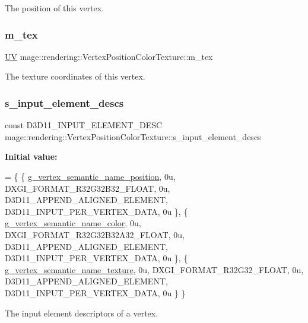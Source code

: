 The position of this vertex. \mbox{\label{structmage_1_1rendering_1_1_vertex_position_color_texture_a48cb88cc9c5d68350249e192152a7104}} 
\subsubsection{\texorpdfstring{m\+\_\+tex}{m\_tex}}
{\footnotesize\ttfamily \mbox{\hyperlink{structmage_1_1_u_v}{UV}} mage\+::rendering\+::\+Vertex\+Position\+Color\+Texture\+::m\+\_\+tex}

The texture coordinates of this vertex. \mbox{\label{structmage_1_1rendering_1_1_vertex_position_color_texture_ac9fd3be6b7e8aa81e0ab17720b2a07f6}} 
\subsubsection{\texorpdfstring{s\+\_\+input\+\_\+element\+\_\+descs}{s\_input\_element\_descs}}
{\footnotesize\ttfamily const D3\+D11\+\_\+\+I\+N\+P\+U\+T\+\_\+\+E\+L\+E\+M\+E\+N\+T\+\_\+\+D\+E\+SC mage\+::rendering\+::\+Vertex\+Position\+Color\+Texture\+::s\+\_\+input\+\_\+element\+\_\+descs\hspace{0.3cm}{\ttfamily [static]}}

{\bfseries Initial value\+:}
\begin{DoxyCode}
= \{
        \{ \mbox{\hyperlink{namespacemage_1_1rendering_1_1anonymous__namespace_02vertex_8cpp_03_a6e875b92e4de38b14e8dc404df41a5ad}{g\_vertex\_semantic\_name\_position}}, 0u, DXGI\_FORMAT\_R32G32B32\_FLOAT, 
         0u, D3D11\_APPEND\_ALIGNED\_ELEMENT, D3D11\_INPUT\_PER\_VERTEX\_DATA, 0u \},
        \{ \mbox{\hyperlink{namespacemage_1_1rendering_1_1anonymous__namespace_02vertex_8cpp_03_aae8cd813faec1e62d4e6463db8c99ab5}{g\_vertex\_semantic\_name\_color}},    0u, DXGI\_FORMAT\_R32G32B32A32\_FLOAT, 
      0u, D3D11\_APPEND\_ALIGNED\_ELEMENT, D3D11\_INPUT\_PER\_VERTEX\_DATA, 0u \},
        \{ \mbox{\hyperlink{namespacemage_1_1rendering_1_1anonymous__namespace_02vertex_8cpp_03_a76de570f9dcc80db1e8e2f0a19536085}{g\_vertex\_semantic\_name\_texture}},  0u, DXGI\_FORMAT\_R32G32\_FLOAT,     
        0u, D3D11\_APPEND\_ALIGNED\_ELEMENT, D3D11\_INPUT\_PER\_VERTEX\_DATA, 0u \}
    \}
\end{DoxyCode}
The input element descriptors of a vertex. 